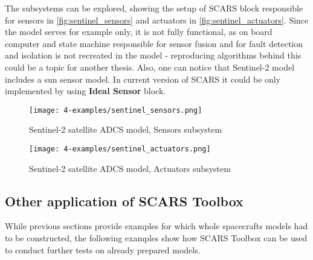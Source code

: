         The subsystems can be explored, showing the setup of SCARS block responsible for sensors in \autoref{fig:sentinel_sensors} and actuators in \autoref{fig:sentinel_actuators}. Since the model serves for example only, it is not fully functional, as on board computer and state machine responsible for sensor fusion and for fault detection and isolation is not recreated in the model - reproducing algorithms behind this could be a topic for another thesis.  Also, one can notice that Sentinel-2 model includes a sun sensor model. In current version of SCARS it could be only implemented by using \textbf{Ideal Sensor} block.
        
        \clearpage
        \begin{sidewaysfigure}
            \centering
            \texttt{[image: 4-examples/sentinel\_sensors.png]}
            \caption{Sentinel-2 satellite ADCS model, Sensors subsystem}
            \label{fig:sentinel_sensors}
        \end{sidewaysfigure}
        \clearpage
        \begin{sidewaysfigure}
            \centering
            \texttt{[image: 4-examples/sentinel\_actuators.png]}
            \caption{Sentinel-2 satellite ADCS model, Actuators subsystem}
            \label{fig:sentinel_sensors}
        \end{sidewaysfigure}
        \clearpage








\subsection{Other application of SCARS Toolbox}\label{sec:test_examples}
    While previous sections provide examples for which whole spacecrafts models had to be constructed, the following examples show how SCARS Toolbox can be used to conduct further tests on already prepared models. 

